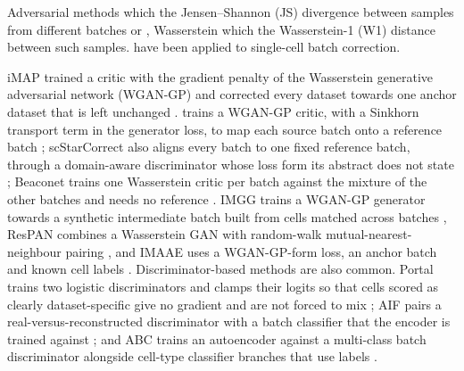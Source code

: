 \documentclass[10pt]{article}
\begin{document}
\qquad Adversarial methods  which  the Jensen--Shannon (JS) divergence \citep{goodfellow2014generative} between samples from different batches or  \citep{ganin2016domain,dincer2020adversarial},  Wasserstein  which  the Wasserstein-1 (W1) distance \citep{arjovsky2017wasserstein,gulrajani2017improved} between such samples.  have been applied  to single-cell batch correction.

\qquad iMAP trained a critic with the gradient penalty of the Wasserstein generative adversarial network (WGAN-GP) and corrected every dataset towards one anchor dataset that is left unchanged \citep{wang2021imap}.  trains a WGAN-GP critic, with a Sinkhorn transport term in the generator loss, to map each source batch onto a reference batch \citep{jiang2026geometric}; scStarCorrect also aligns every batch to one fixed reference batch, through a domain-aware discriminator whose loss form its abstract does not state \citep{gu2025scstarcorrect}; Beaconet trains one Wasserstein critic per batch against the mixture of the other batches and needs no reference \citep{xu2024beaconet}. IMGG trains a WGAN-GP generator towards a synthetic intermediate batch built from cells matched across batches \citep{wang2022imgg}, ResPAN combines a Wasserstein GAN with random-walk mutual-nearest-neighbour pairing \citep{wang2022respan}, and IMAAE uses a WGAN-GP-form loss, an anchor batch and known cell labels \citep{wang2023integrating}. Discriminator-based methods are also common. Portal trains two logistic discriminators and clamps their logits so that cells scored as clearly dataset-specific give no gradient and are not forced to mix \citep{zhao2022adversarial}; AIF pairs a real-versus-reconstructed discriminator with a batch classifier that the encoder is trained against \citep{monnier2024novel}; and ABC trains an autoencoder against a multi-class batch discriminator alongside cell-type classifier branches that use labels \citep{danino2024batch}.
\end{document}
